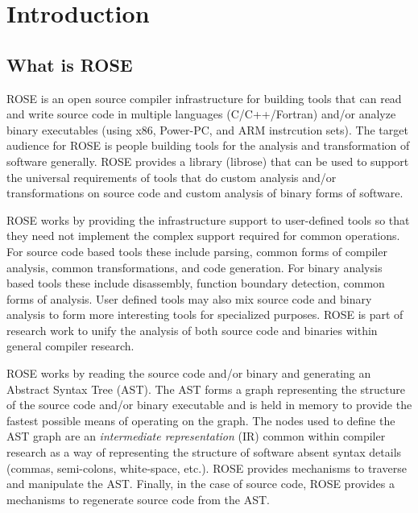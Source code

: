\chapter{Introduction}

\section{What is ROSE}

%       
% 
   ROSE is an open source compiler infrastructure for building tools that can
read and write source code in multiple languages (C/C++/Fortran)
and/or analyze binary executables (using x86, Power-PC, and ARM instrcution sets).
The target audience for ROSE is people building tools for the analysis
and transformation of software generally.
ROSE provides a library (librose) that can be 
used to support the universal requirements of tools that
do custom analysis and/or transformations on source code
and custom analysis of binary forms of software.

   ROSE works by providing the infrastructure support to
user-defined tools so that they need not implement the 
complex support required for common operations. 
For source code based tools these include parsing, common forms of 
compiler analysis, common transformations, and code generation.
For binary analysis based tools these include disassembly,
function boundary detection, common forms of analysis.
User defined tools may also mix source code and binary analysis
to form more interesting tools for specialized purposes.
ROSE is part of research work to unify the analysis of
both source code and binaries within general compiler research.

   ROSE works by reading the source code and/or binary
and generating an Abstract Syntax Tree (AST).  The AST forms
a graph representing the structure of the source code and/or binary
executable and is held in memory to provide the fastest possible means 
of operating on the graph.  The nodes used to define the AST graph are 
an {\em intermediate representation} (IR) common within compiler research
as a way of representing the structure of software absent syntax details
(commas, semi-colons, white-space, etc.).  ROSE provides mechanisms to 
traverse and manipulate the AST. Finally, in the case of source code, 
ROSE provides a mechanisms to regenerate source code from the AST.

